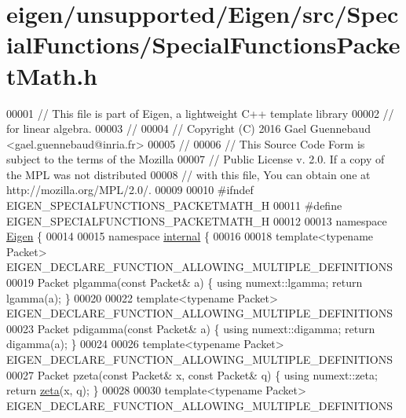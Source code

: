 \hypertarget{eigen_2unsupported_2_eigen_2src_2_special_functions_2_special_functions_packet_math_8h_source}{}\section{eigen/unsupported/\+Eigen/src/\+Special\+Functions/\+Special\+Functions\+Packet\+Math.h}
\label{eigen_2unsupported_2_eigen_2src_2_special_functions_2_special_functions_packet_math_8h_source}

\begin{DoxyCode}
00001 \textcolor{comment}{// This file is part of Eigen, a lightweight C++ template library}
00002 \textcolor{comment}{// for linear algebra.}
00003 \textcolor{comment}{//}
00004 \textcolor{comment}{// Copyright (C) 2016 Gael Guennebaud <gael.guennebaud@inria.fr>}
00005 \textcolor{comment}{//}
00006 \textcolor{comment}{// This Source Code Form is subject to the terms of the Mozilla}
00007 \textcolor{comment}{// Public License v. 2.0. If a copy of the MPL was not distributed}
00008 \textcolor{comment}{// with this file, You can obtain one at http://mozilla.org/MPL/2.0/.}
00009 
00010 \textcolor{preprocessor}{#ifndef EIGEN\_SPECIALFUNCTIONS\_PACKETMATH\_H}
00011 \textcolor{preprocessor}{#define EIGEN\_SPECIALFUNCTIONS\_PACKETMATH\_H}
00012 
00013 \textcolor{keyword}{namespace }\hyperlink{namespace_eigen}{Eigen} \{
00014 
00015 \textcolor{keyword}{namespace }\hyperlink{namespaceinternal}{internal} \{
00016 
00018 \textcolor{keyword}{template}<\textcolor{keyword}{typename} Packet> EIGEN\_DECLARE\_FUNCTION\_ALLOWING\_MULTIPLE\_DEFINITIONS
00019 Packet plgamma(\textcolor{keyword}{const} Packet& a) \{ \textcolor{keyword}{using} numext::lgamma; \textcolor{keywordflow}{return} lgamma(a); \}
00020 
00022 \textcolor{keyword}{template}<\textcolor{keyword}{typename} Packet> EIGEN\_DECLARE\_FUNCTION\_ALLOWING\_MULTIPLE\_DEFINITIONS
00023 Packet pdigamma(\textcolor{keyword}{const} Packet& a) \{ \textcolor{keyword}{using} numext::digamma; \textcolor{keywordflow}{return} digamma(a); \}
00024 
00026 \textcolor{keyword}{template}<\textcolor{keyword}{typename} Packet> EIGEN\_DECLARE\_FUNCTION\_ALLOWING\_MULTIPLE\_DEFINITIONS
00027 Packet pzeta(\textcolor{keyword}{const} Packet& x, \textcolor{keyword}{const} Packet& q) \{ \textcolor{keyword}{using} numext::zeta; \textcolor{keywordflow}{return} \hyperlink{namespace_eigen_af9555e27540da78d2c4bdd17d3b750b1}{zeta}(x, q); \}
00028 
00030 \textcolor{keyword}{template}<\textcolor{keyword}{typename} Packet> EIGEN\_DECLARE\_FUNCTION\_ALLOWING\_MULTIPLE\_DEFINITIONS

\end{DoxyCode}
